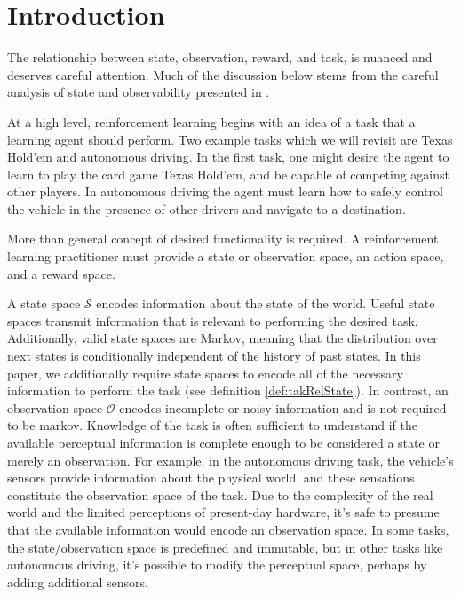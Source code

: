 \documentclass{article} %
\theoremstyle{definition}
\begin{document}
\section{Introduction}
The relationship between state, observation, reward, and task, is
nuanced and deserves careful attention. Much of the discussion below
stems from the careful analysis of state and observability presented
in \cite{McCallum96}.

At a high level, reinforcement learning begins with an idea of a task
that a learning agent should perform. Two example tasks which we will
revisit are Texas Hold'em and autonomous driving. In the first task,
one might desire the agent to learn to play the card game Texas
Hold'em, and be capable of competing against other players. In
autonomous driving the agent must learn how to safely control the
vehicle in the presence of other drivers and navigate to a
destination.

More than general concept of desired functionality is required. A
reinforcement learning practitioner must provide a state or
observation space, an action space, and a reward space.

A state space $\mathcal{S}$ encodes information about the state of the
world. Useful state spaces transmit information that is relevant to
performing the desired task. Additionally, valid state spaces are
Markov, meaning that the distribution over next states is
conditionally independent of the history of past states. In this
paper, we additionally require state spaces to encode all of the
necessary information to perform the task (see definition
\ref{def:takRelState}). In contrast, an observation space
$\mathcal{O}$ encodes incomplete or noisy information and is not
required to be markov. Knowledge of the task is often sufficient to
understand if the available perceptual information is complete enough
to be considered a state or merely an observation. For example, in the
autonomous driving task, the vehicle's sensors provide information
about the physical world, and these sensations constitute the
observation space of the task. Due to the complexity of the real world
and the limited perceptions of present-day hardware, it's safe to
presume that the available information would encode an observation
space. In some tasks, the state/observation space is predefined and
immutable, but in other tasks like autonomous driving, it's possible
to modify the perceptual space, perhaps by adding additional sensors.
\end{document}
